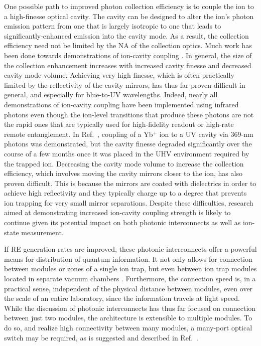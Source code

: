 \documentclass[%
12pt,
 amsmath,amssymb,
]{revtex4-2}
\begin{document}
One possible path to improved photon collection efficiency is to couple the ion to a high-finesse optical cavity.  The cavity can be designed to alter the ion's photon emission pattern from one that is largely isotropic to one that leads to significantly-enhanced emission into the cavity mode.  As a result, the collection efficiency need not be limited by the NA of the collection optics.  Much work has been done towards demonstrations of ion-cavity coupling \cite{MundtCavity2002, KellerCavity2004, HerskindCavity2009, StuteCavity2012, SteinerCavity2013, StuteCavity2013, TakahashiCavity2018, BallanceCavity2017, BegleyCavity2016}.  In general, the size of the collection enhancement increases with increased cavity finesse and decreased cavity mode volume.  Achieving very high finesse, which is often practically limited by the reflectivity of the cavity mirrors, has thus far proven difficult in general, and especially for blue-to-UV wavelengths.  Indeed, nearly all demonstrations of ion-cavity coupling have been implemented using infrared photons even though the ion-level transitions that produce these photons are not the rapid ones that are typically used for high-fidelity readout or high-rate remote entanglement.  In Ref.~\cite{BallanceCavity2017}, coupling of a Yb$^+$ ion to a UV cavity via 369-nm photons was demonstrated, but the cavity finesse degraded significantly over the course of a few months once it was placed in the UHV environment required by the trapped ion.  Decreasing the cavity mode volume to increase the collection efficiency, which involves moving the cavity mirrors closer to the ion, has also proven difficult.  This is because the mirrors are coated with dielectrics in order to achieve high reflectivity and they typically charge up to a degree that prevents ion trapping for very small mirror separations. Despite these difficulties, research aimed at demonstrating increased ion-cavity coupling strength is likely to continue given its potential impact on both photonic interconnects as well as ion-state measurement.

If RE generation rates are improved, these photonic interconnects offer a powerful means for distribution of quantum information.  It not only allows for connection between modules or zones of a single ion trap, but even between ion trap modules located in separate vacuum chambers \cite{MaunzRemoteInterference2007, Moehring2007}.  Furthermore, the connection speed is, in a practical sense, independent of the physical distance between modules, even over the scale of an entire laboratory, since the information travels at light speed.  While the discussion of photonic interconnects has thus far focused on connection between just two modules, the architecture is extensible to multiple modules.  To do so, and realize high connectivity between many modules, a many-port optical switch may be required, as is suggested and described in Ref.~\cite{MonroeModularArch2014}.
\end{document}
